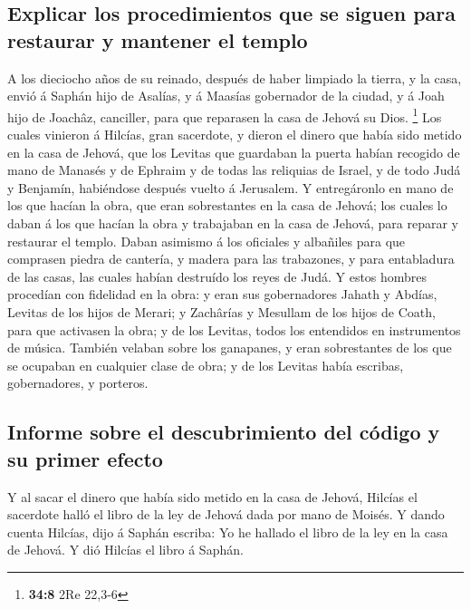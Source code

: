 \hypertarget{explicar-los-procedimientos-que-se-siguen-para-restaurar-y-mantener-el-templo}{%
\subsection{Explicar los procedimientos que se siguen para restaurar y
mantener el
templo}\label{explicar-los-procedimientos-que-se-siguen-para-restaurar-y-mantener-el-templo}}

 A los dieciocho años de su reinado, después de haber
limpiado la tierra, y la casa, envió á Saphán hijo de Asalías, y á
Maasías gobernador de la ciudad, y á Joah hijo de Joachâz, canciller,
para que reparasen la casa de Jehová su Dios. \footnote{\textbf{34:8}
  2Re 22,3-6}  Los cuales vinieron á Hilcías, gran
sacerdote, y dieron el dinero que había sido metido en la casa de
Jehová, que los Levitas que guardaban la puerta habían recogido de mano
de Manasés y de Ephraim y de todas las reliquias de Israel, y de todo
Judá y Benjamín, habiéndose después vuelto á Jerusalem. 
Y entregáronlo en mano de los que hacían la obra, que eran sobrestantes
en la casa de Jehová; los cuales lo daban á los que hacían la obra y
trabajaban en la casa de Jehová, para reparar y restaurar el templo.
 Daban asimismo á los oficiales y albañiles para que
comprasen piedra de cantería, y madera para las trabazones, y para
entabladura de las casas, las cuales habían destruído los reyes de Judá.
 Y estos hombres procedían con fidelidad en la obra: y
eran sus gobernadores Jahath y Abdías, Levitas de los hijos de Merari; y
Zachârías y Mesullam de los hijos de Coath, para que activasen la obra;
y de los Levitas, todos los entendidos en instrumentos de música.
 También velaban sobre los ganapanes, y eran sobrestantes
de los que se ocupaban en cualquier clase de obra; y de los Levitas
había escribas, gobernadores, y porteros.

\hypertarget{informe-sobre-el-descubrimiento-del-cuxf3digo-y-su-primer-efecto}{%
\subsection{Informe sobre el descubrimiento del código y su primer
efecto}\label{informe-sobre-el-descubrimiento-del-cuxf3digo-y-su-primer-efecto}}

 Y al sacar el dinero que había sido metido en la casa de
Jehová, Hilcías el sacerdote halló el libro de la ley de Jehová dada por
mano de Moisés.  Y dando cuenta Hilcías, dijo á Saphán
escriba: Yo he hallado el libro de la ley en la casa de Jehová. Y dió
Hilcías el libro á Saphán.

